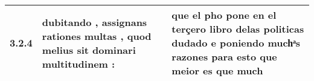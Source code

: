 \begin{tabular}{|p{1cm}|p{6.5cm}|p{6.5cm}|}

\hline
3.2.4 & dubitando , \textbf{ assignans rationes multas , } quod melius sit dominari multitudinem : & que el pho pone en el terçero libro delas politicas dudado \textbf{ e poniendo muchͣs razones para esto } que meior es que much \\\hline

\end{tabular}
